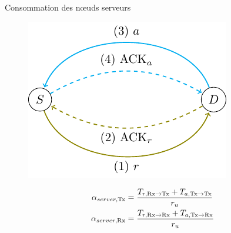 


\begin{frame}{Consommation des nœuds serveurs}

  \begin{figure}
    \centering
    \includegraphics[scale=.8]{figures/conso_server_slides.pdf}
  \end{figure}


    \begin{align}
      \alpha_{server, \textrm{Tx}} &= \frac{T_{r, \textrm{Rx} \to \textrm{Tx}} + T_{a, \textrm{Tx} \to \textrm{Tx}}}{r_u}
      \label{contikimac:eq:coap_tx} \\
      \alpha_{server, \textrm{Rx}} &= \frac{T_{r, \textrm{Rx} \to \textrm{Rx}} + T_{a, \textrm{Tx} \to \textrm{Rx}}}{r_u}
      \label{contikimac:eq:coap_rx}
    \end{align}

\end{frame}


